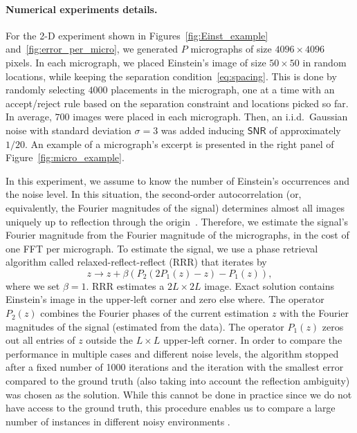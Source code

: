 \documentclass[english,11pt]{article}
\newcommand{\1}{\mathbf{1}}
\newcommand{\TODO}[1]{{\color{red}{[#1]}}}
\numberwithin{equation}{section}
\theoremstyle{plain}
\theoremstyle{definition}
\theoremstyle{remark}
\theoremstyle{plain}
\theoremstyle{remark}
\theoremstyle{plain}
\theoremstyle{plain}
\newcommand{\SNR}{\ensuremath{\textsf{SNR}}}
\begin{document}
\paragraph{Numerical experiments details.}
For the 2-D experiment shown in Figures~\ref{fig:Einst_example} and~\ref{fig:error_per_micro}, we generated $P$ micrographs of size $4096\times 4096$ pixels. 
In each micrograph, we placed Einstein's image of size $50\times 50$  in random locations, while keeping the separation condition~\eqref{eq:spacing}.  
This is done by randomly selecting $4000$ placements in the micrograph, one at a time with
an accept/reject rule based on the separation constraint and locations picked so far. In average, $700$ images were placed in each micrograph.   
Then, an i.i.d.\ Gaussian noise with standard deviation $\sigma=3$ was added inducing $\SNR$ of approximately $1/20$. An example of a micrograph's excerpt is presented in the right panel of Figure~\ref{fig:micro_example}.


In this experiment, we assume to know the number of Einstein's occurrences and the noise level. 
In this situation, the second-order autocorrelation (or, equivalently, the Fourier magnitudes of the signal) determines  almost all images  uniquely up to reflection through the origin~\cite{hayes1982reconstruction,bendory2017fourier}. 
Therefore, we estimate the signal's Fourier magnitude from the Fourier magnitude of the micrographs, in the cost of one  FFT per micrograph.
To estimate the signal, we use a phase retrieval algorithm called relaxed-reflect-reflect (RRR) that iterates by
\begin{equation}
z \rightarrow z + \beta (P_2(2P_1(z) - z) - P_1(z)),
\end{equation}
where we set $\beta=1$.
RRR estimates a $2L\times 2L$ image. Exact solution contains Einstein's image in the upper-left corner and zero else where. The operator $P_2(z)$ combines the Fourier phases of  the current estimation $z$ with the Fourier magnitudes of the signal  (estimated from the data). The operator $P_1(z)$ zeros out all entries of $z$ outside the $L\times L$ upper-left corner. 
In order to compare the performance in multiple cases and different noise levels, the algorithm stopped after a fixed number of 1000 iterations and the iteration with the smallest error compared to the ground truth (also taking into account the reflection ambiguity) was chosen as the solution. While this cannot be done in practice since we do not have access to the ground truth, this procedure enables us to compare a large number of instances in different noisy environments \TODO{Note the last two sentences!}.
\end{document}
